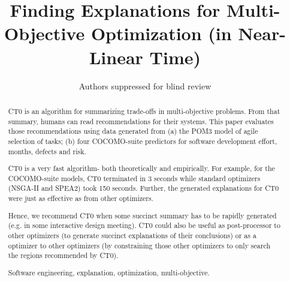 \documentclass[runningheads]{llncs}
\newcommand{\keywords}[1]{\par\addvspace\baselineskip
\noindent\keywordname\enspace\ignorespaces#1}
\begin{document}
\mainmatter  %

\title{Finding Explanations for Multi-Objective Optimization
(in Near-Linear Time)}


%
%
\author{Authors suppressed for blind review}

%


%
%
 
\maketitle


\begin{abstract}
CT0 is an algorithm for summarizing trade-offs in multi-objective problems.
From that summary, humans can read recommendations for their systems.
This paper evaluates those recommendations using data
generated from   (a) the POM3 model of agile selection
of tasks; (b) four COCOMO-suite predictors for software
development effort, months, defects and risk.

CT0 is a very fast algorithm- both theoretically and empirically.
For example, for the COCOMO-suite models, CT0 terminated
in 3 seconds while standard optimizers (NSGA-II and SPEA2)
took 150 seconds.
Further, the  generated 
explanations for CT0 were just as effective as from other optimizers.

Hence, we recommend CT0 when some succinct summary
has to be rapidly generated (e.g.  in some
interactive design meeting). CT0 could also be
useful as post-processor to other optimizers (to
generate succinct explanations of their conclusions)
or as a optimizer to other optimizers (by
constraining those other optimizers to only search
the regions recommended by CT0).

\keywords{Software engineering, explanation, optimization, multi-objective.}
\end{abstract}
\end{document}
